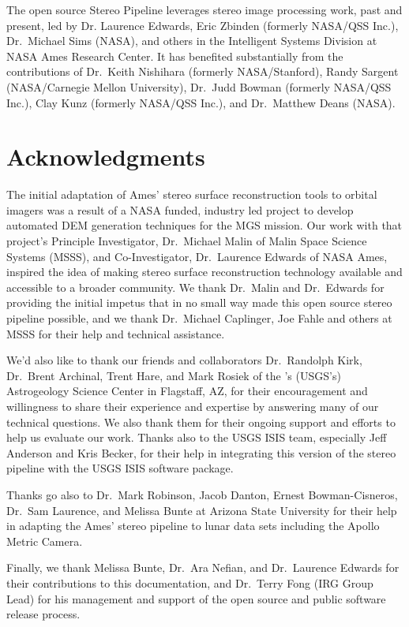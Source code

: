 The open source Stereo Pipeline leverages stereo image processing
work, past and present, led by Dr. Laurence Edwards, Eric Zbinden
(formerly NASA/QSS Inc.), Dr.~Michael Sims (NASA), and others in the
Intelligent Systems Division at NASA Ames Research Center. It has
benefited substantially from the contributions of Dr.~Keith Nishihara
(formerly NASA/Stanford), Randy Sargent (NASA/Carnegie Mellon
University), Dr.~Judd Bowman (formerly NASA/QSS Inc.), Clay Kunz
(formerly NASA/QSS Inc.), and Dr.~Matthew Deans (NASA).

\section*{Acknowledgments}

The initial adaptation of Ames' stereo surface reconstruction tools to
orbital imagers was a result of a NASA funded, industry led project to
develop automated \ac{DEM} generation techniques for
the \ac{MGS} mission. Our work with that project's
Principle Investigator, Dr.~Michael Malin of Malin Space Science
Systems (MSSS), and Co-Investigator, Dr.~Laurence Edwards of NASA
Ames, inspired the idea of making stereo surface reconstruction
technology available and accessible to a broader community.  We thank
Dr.~Malin and Dr.~Edwards for providing the initial impetus that in no
small way made this open source stereo pipeline possible, and we thank
Dr.~Michael Caplinger, Joe Fahle and others at MSSS for their help and
technical assistance.

We'd also like to thank our friends and collaborators Dr.~Randolph
Kirk, Dr.~Brent Archinal, Trent Hare, and Mark Rosiek of the
's (\acs{USGS}'s) Astrogeology Science Center in
Flagstaff, AZ, for their encouragement and willingness to share
their experience and expertise by answering many of our technical
questions.  We also thank them for their ongoing support and efforts
to help us evaluate our work.  Thanks also to the \ac{USGS} \ac{ISIS} team,
especially Jeff Anderson and Kris Becker, for their help in integrating
this version of the stereo pipeline with the \ac{USGS} \ac{ISIS} software
package.

Thanks go also to Dr.~Mark Robinson, Jacob Danton, Ernest
Bowman-Cisneros, Dr.~Sam Laurence, and Melissa Bunte at Arizona State
University for their help in adapting the Ames' stereo pipeline to
lunar data sets including the Apollo Metric Camera.

Finally, we thank Melissa Bunte, Dr.~Ara Nefian, and Dr.~Laurence
Edwards for their contributions to this documentation, and Dr.~Terry
Fong (IRG Group Lead) for his management and support of the open
source and public software release process.


